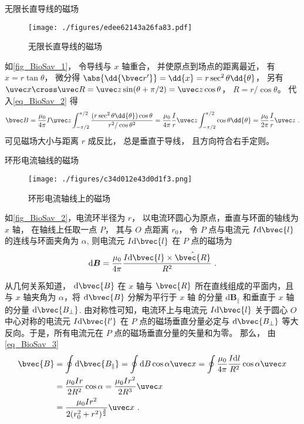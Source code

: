 \begin{example}{无限长直导线的磁场}\label{ex_BioSav_1}
\begin{figure}[ht]
\centering
\texttt{[image: ./figures/edee62143a26fa83.pdf]}
\caption{无限长直导线的磁场} \label{fig_BioSav_1}
\end{figure}
如\autoref{fig_BioSav_1}， 令导线与 $x$ 轴重合， 并使原点到场点的距离最近， 有 $x = r\tan\theta$， 微分得 $\abs{\dd{\bvec r'}} = \dd{x} = r\sec^2\theta\dd{\theta}$， 另有 $\uvec x\cross\uvec R = \uvec z\sin(\theta + \pi/2) = \uvec z\cos\theta $， $R = r/\cos\theta$。 代入\autoref{eq_BioSav_2} 得
\begin{equation}
\bvec B = \frac{\mu_0}{4\pi} I \uvec z\int_{-\pi/2}^{\pi/2} \frac{(r \sec^2\theta \dd{\theta}) \cos\theta}{r^2/\cos\theta^2}
= \frac{\mu_0}{4\pi} \frac Ir \uvec z\int_{-\pi/2}^{\pi/2} \cos\theta \dd{\theta}
= \frac{\mu_0}{2\pi} \frac Ir\uvec z~.
\end{equation}
可见磁场大小与距离 $r$ 成反比， 总是垂直于导线， 且方向符合右手定则。
\end{example}

\begin{example}{环形电流轴线的磁场}\label{ex_BioSav_2}
\begin{figure}[ht]
\centering
\texttt{[image: ./figures/c34d012e43d0d1f3.png]}
\caption{环形电流轴线上的磁场} \label{fig_BioSav_2}
\end{figure}
如\autoref{fig_BioSav_2}，电流环半径为 $r$， 以电流环圆心为原点，垂直与环面的轴线为 $x$ 轴， 在轴线上任取一点 $P$， 其与 $O$ 点距离 $r_0$， 令 $P$ 点与电流元 $I\mathrm{d}\bvec{l}$ 的连线与环面夹角为 $\alpha$, 则电流元 $I\mathrm{d}\bvec{l}$ 在 $P$ 点的磁场为
\begin{equation}
\mathrm{d}\boldsymbol{B}=\frac{\mu_0}{4\pi}\frac{I\mathrm{d}\bvec{l}\times\hat{\bvec{R}}}{R^2}~.
\end{equation}

从几何关系知道， $\mathrm{d}\bvec{B}$ 在 $x$ 轴与 $\bvec{R}$ 所在直线组成的平面内，且与 $x$ 轴夹角为 $\alpha$，将 $\mathrm{d}\bvec{B}$ 分解为平行于 $x$ 轴 的分量 $\mathrm{d}\boldsymbol{B_\parallel}$ 和垂直于 $x$ 轴的分量 $\mathrm{d}\bvec{B_\bot}$. 由对称性可知，电流环上与电流元 $I\mathrm{d}\bvec{l}$ 关于圆心 $O$ 中心对称的电流元 $I\mathrm{d}\bvec{l'}$ 在 $P$ 点的磁场垂直分量必定与 $\mathrm{d}\bvec{B_\bot}$ 等大反向。于是，所有电流元在 $P$ 点的磁场垂直分量的矢量和为零。 那么， 由\autoref{eq_BioSav_3} 
\begin{equation}
\begin{aligned}
\bvec{B}&=\oint{\mathrm{d}\bvec{B_\parallel}}=\oint\mathrm{d}B\cos{\alpha}\uvec x=\oint\frac{\mu_0}{4\pi}\frac{I\mathrm{d}l}{R^2}\cos\alpha\uvec x\\
&=\frac{\mu_0Ir}{2R^2}\cos\alpha=\frac{\mu_0Ir^2}{2R^3}\uvec x\\
&=\frac{\mu_0Ir^2}{2(r_0^2+r^2)^{\frac{3}{2}}}\uvec x~.
\end{aligned}
\end{equation}
\end{example}

